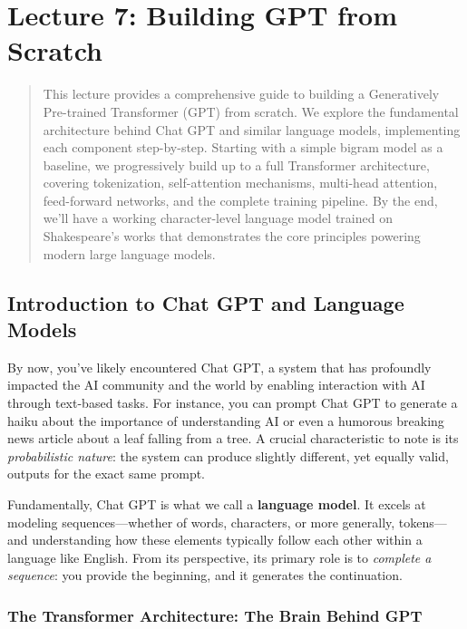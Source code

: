
\section{Lecture 7: Building GPT from Scratch}

\begin{abstract}
This lecture provides a comprehensive guide to building a Generatively Pre-trained Transformer (GPT) from scratch. We explore the fundamental architecture behind Chat GPT and similar language models, implementing each component step-by-step. Starting with a simple bigram model as a baseline, we progressively build up to a full Transformer architecture, covering tokenization, self-attention mechanisms, multi-head attention, feed-forward networks, and the complete training pipeline. By the end, we'll have a working character-level language model trained on Shakespeare's works that demonstrates the core principles powering modern large language models.
\end{abstract}

\subsection{Introduction to Chat GPT and Language Models}

By now, you've likely encountered Chat GPT, a system that has profoundly impacted the AI community and the world by enabling interaction with AI through text-based tasks. For instance, you can prompt Chat GPT to generate a haiku about the importance of understanding AI or even a humorous breaking news article about a leaf falling from a tree. A crucial characteristic to note is its \textit{probabilistic nature}: the system can produce slightly different, yet equally valid, outputs for the exact same prompt.

Fundamentally, Chat GPT is what we call a \textbf{language model}. It excels at modeling sequences---whether of words, characters, or more generally, tokens---and understanding how these elements typically follow each other within a language like English. From its perspective, its primary role is to \textit{complete a sequence}: you provide the beginning, and it generates the continuation.

\subsubsection{The Transformer Architecture: The Brain Behind GPT}

